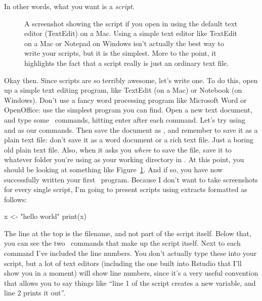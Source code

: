 In other words, what you want is a {\it script}.



\begin{figure}[t]
\begin{center}
\caption{A screenshot showing the  script if you open in using the default text editor (TextEdit) on a Mac. Using a simple text editor like TextEdit on a Mac or Notepad on Windows isn't actually the best way to write your scripts, but it is the simplest. More to the point, it highlights the fact that a script really is just an ordinary text file.}
\label{fig:script}
\HR
\end{center}
\end{figure}

Okay then. Since scripts are so terribly awesome, let's write one. To do this, open up a simple text editing program, like TextEdit (on a Mac) or Notebook (on Windows). Don't use a fancy word processing program like Microsoft Word or OpenOffice: use the simplest program you can find. Open a new text document, and type some \R\ commands, hitting enter after each command. Let's try using  and  as our commands. Then save the document as , and remember to save it as a plain text file: don't save it as a word document or a rich text file. Just a boring old plain text file. Also, when it asks you {\it where} to save the file, save it to whatever folder you're using as your working directory in \R. At this point, you should be looking at something like Figure~\ref{fig:script}. And if so, you have now successfully written your first \R\ program. Because I don't want to take screenshots for every single script, I'm going to present scripts using extracts formatted as follows:

\begin{script}
x <- "hello world"
print(x)
\end{script}
The line at the top is the filename, and not part of the script itself. Below that, you can see the two \R\ commands that make up the script itself. Next to each command I've included the line numbers. You don't actually type these into your script, but a lot of text editors (including the one built into Rstudio that I'll show you in a moment) will show line numbers, since it's a very useful convention that allows you to say things like ``line 1 of the script creates a new variable, and line 2 prints it out''. 

